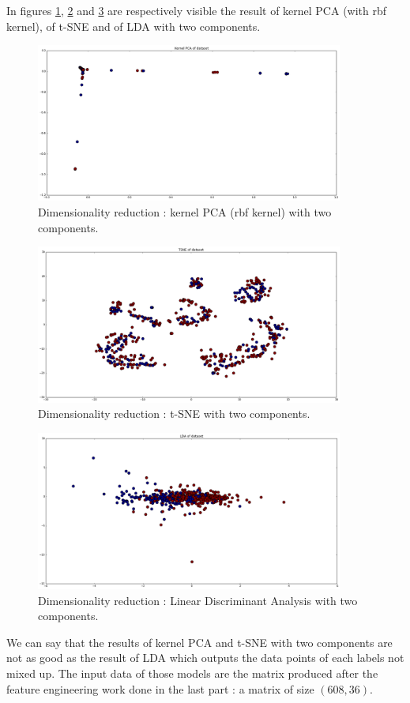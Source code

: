 		In figures \ref{fig:kpca}, \ref{fig:tsne} and \ref{fig:lda} are respectively visible the result of kernel PCA (with rbf kernel), of t-SNE and of LDA with two components.\\

		\begin{figure}[h]
			\centering
			\includegraphics[width=0.9\textwidth]{images/kpca.png}
			\caption{Dimensionality reduction : kernel PCA (rbf kernel) with two components.}
			\label{fig:kpca}
		\end{figure}
		\begin{figure}[h]
			\centering
			\includegraphics[width=0.9\textwidth]{images/tsne.png}
			\caption{Dimensionality reduction : t-SNE with two components.}
			\label{fig:tsne}
		\end{figure}
		\begin{figure}[h]
			\centering
			\includegraphics[width=0.9\textwidth]{images/lda.png}
			\caption{Dimensionality reduction : Linear Discriminant Analysis with two components.}
			\label{fig:lda}
		\end{figure}
		We can say that the results of kernel PCA and t-SNE with two components are not as good as the result of LDA which outputs the data points of each labels not mixed up. The input data of those models are the matrix produced after the feature engineering work done in the last part : a matrix of size $(608,36)$.\\

